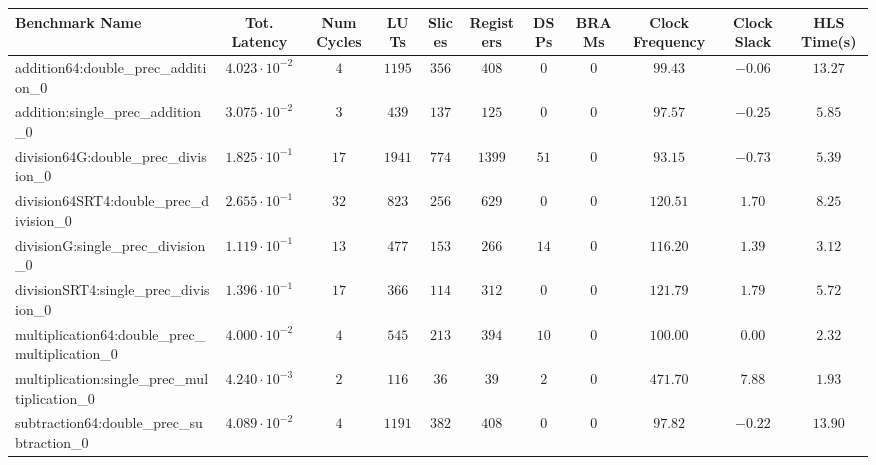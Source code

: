 \begin{tabular}{|l|c|c|c|c|c|c|c|c|c|c|}
\hline
Benchmark Name                                   & Tot. Latency            & Num Cycles & LUTs     & Slices   & Registers & DSPs   & BRAMs & Clock Frequency & Clock Slack & HLS Time(s) \\
\hline
addition64:double\_prec\_addition\_0             & $ 4.023 \cdot 10^{-2} $ & $ 4      $ & $ 1195 $ & $ 356  $ & $ 408   $ & $ 0  $ & $ 0 $ & $ 99.43       $ & $ -0.06   $ & $ 13.27   $ \\
addition:single\_prec\_addition\_0               & $ 3.075 \cdot 10^{-2} $ & $ 3      $ & $ 439  $ & $ 137  $ & $ 125   $ & $ 0  $ & $ 0 $ & $ 97.57       $ & $ -0.25   $ & $ 5.85    $ \\
division64G:double\_prec\_division\_0            & $ 1.825 \cdot 10^{-1} $ & $ 17     $ & $ 1941 $ & $ 774  $ & $ 1399  $ & $ 51 $ & $ 0 $ & $ 93.15       $ & $ -0.73   $ & $ 5.39    $ \\
division64SRT4:double\_prec\_division\_0         & $ 2.655 \cdot 10^{-1} $ & $ 32     $ & $ 823  $ & $ 256  $ & $ 629   $ & $ 0  $ & $ 0 $ & $ 120.51      $ & $ 1.70    $ & $ 8.25    $ \\
divisionG:single\_prec\_division\_0              & $ 1.119 \cdot 10^{-1} $ & $ 13     $ & $ 477  $ & $ 153  $ & $ 266   $ & $ 14 $ & $ 0 $ & $ 116.20      $ & $ 1.39    $ & $ 3.12    $ \\
divisionSRT4:single\_prec\_division\_0           & $ 1.396 \cdot 10^{-1} $ & $ 17     $ & $ 366  $ & $ 114  $ & $ 312   $ & $ 0  $ & $ 0 $ & $ 121.79      $ & $ 1.79    $ & $ 5.72    $ \\
multiplication64:double\_prec\_multiplication\_0 & $ 4.000 \cdot 10^{-2} $ & $ 4      $ & $ 545  $ & $ 213  $ & $ 394   $ & $ 10 $ & $ 0 $ & $ 100.00      $ & $ 0.00    $ & $ 2.32    $ \\
multiplication:single\_prec\_multiplication\_0   & $ 4.240 \cdot 10^{-3} $ & $ 2      $ & $ 116  $ & $ 36   $ & $ 39    $ & $ 2  $ & $ 0 $ & $ 471.70      $ & $ 7.88    $ & $ 1.93    $ \\
subtraction64:double\_prec\_subtraction\_0       & $ 4.089 \cdot 10^{-2} $ & $ 4      $ & $ 1191 $ & $ 382  $ & $ 408   $ & $ 0  $ & $ 0 $ & $ 97.82       $ & $ -0.22   $ & $ 13.90   $ \\

\end{tabular}
